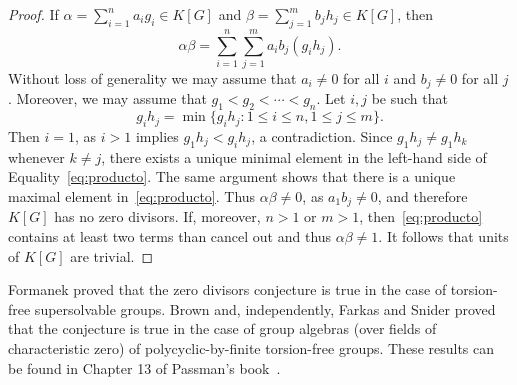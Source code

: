 \begin{graybox}
\begin{proof}
	If $\alpha=\sum_{i=1}^na_ig_i\in K[G]$ and
	$\beta=\sum_{j=1}^mb_jh_j\in K[G]$, then 
	\begin{equation}
		\label{eq:producto}
		\alpha\beta=\sum_{i=1}^n\sum_{j=1}^ma_ib_j(g_ih_j).
	\end{equation}
	Without loss of generality we may assume that $a_i\ne 0$ for
	all $i$ and $b_j\ne 0$ for all $j$. Moreover, we may assume that 
	$g_1<g_2<\cdots<g_n$. Let $i,j$ be such that 
	\[
		g_ih_j=\min\{g_ih_j:1\leq i\leq n,1\leq j\leq m\}.
	\]
	Then $i=1$, as $i>1$ implies
	$g_1h_j<g_ih_j$, a contradiction. Since $g_1h_j\ne g_1h_k$ whenever 
	$k\ne j$, there exists a unique minimal element in the left-hand side of Equality~\eqref{eq:producto}. The same argument shows that there is a unique
	maximal element in~\eqref{eq:producto}. Thus 
	$\alpha\beta\ne 0$, as $a_1b_j\ne 0$, and therefore $K[G]$ has no zero divisors. 
	If, moreover, $n>1$ or $m>1$, then~\eqref{eq:producto} contains at least two
	terms than cancel out and thus  
	$\alpha\beta\ne1$. It follows that units of $K[G]$ are trivial. 
\end{proof}

Formanek proved that the zero divisors conjecture is true 
in the case of torsion-free supersolvable groups. Brown and, independently, 
Farkas and Snider proved that the conjecture is true 
in the case of group algebras (over fields of characteristic zero) of 
polycyclic-by-finite torsion-free groups. These results
can be found in Chapter 13 of
Passman's book~\cite{MR798076}. 
\end{graybox}

